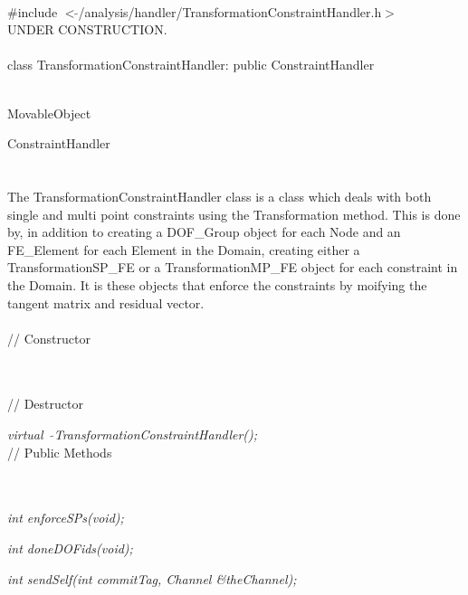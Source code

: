 
   \\
\indent \#include $<\tilde{
}$/analysis/handler/TransformationConstraintHandler.h$>$  \\ 

UNDER CONSTRUCTION.\\

  \\
class TransformationConstraintHandler: public ConstraintHandler  


 \\
MovableObject 

\indent\indent ConstraintHandler \\
\indent\indent{} \\

 \\ 
\indent The TransformationConstraintHandler class is a class which deals with
both single and multi point constraints using the Transformation method. 
This is done by, in addition to creating a DOF\_Group object
for each Node and an FE\_Element for each Element in the Domain,
creating either a TransformationSP\_FE or a TransformationMP\_FE object for each
constraint in the Domain. It is these objects that enforce the
constraints by moifying the tangent matrix and residual vector. \\ 


 \\
// Constructor 

\\  \\ 
// Destructor 

{\em virtual~ $\tilde{}$TransformationConstraintHandler();}\\  

// Public Methods

 \\ 
 \\ 
{\em int enforceSPs(void); }

{\em int doneDOFids(void); }

{\em int sendSelf(int commitTag, Channel \&theChannel); } 

